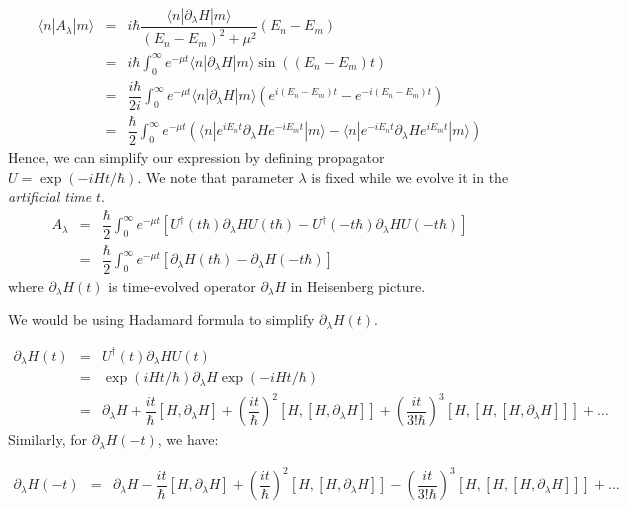 \documentclass[11pt,a4paper]{article}
\begin{document}
\begin{eqnarray}
\langle n | A_{\lambda} | m \rangle &=&  i \hbar \dfrac{\langle n | \partial_{\lambda}H  | m \rangle}{(E_n-E_m)^2 + \mu^2} (E_n-E_m) \\
&=& i \hbar  \int^{\infty}_{0} e^{-\mu t} \langle n | \partial_{\lambda}H  | m \rangle \sin((E_n-E_m)t) \\
&=& \dfrac{i \hbar}{2i}  \int^{\infty}_{0} e^{-\mu t} \langle n | \partial_{\lambda}H  | m \rangle \left( e^{i(E_n-E_m)t} - e^{-i(E_n-E_m)t} \right) \\
&=& \dfrac{ \hbar}{2}  \int^{\infty}_{0} e^{-\mu t}  \left(  \langle n | e^{iE_nt} \partial_{\lambda}H   e^{-i E_m t} | m \rangle  -  \langle n |e^{-i E_n t}  \partial_{\lambda}H  e^{ i E_mt} | m \rangle  \right) 
\end{eqnarray}
Hence, we can simplify our expression by defining propagator  $U= \exp(-i H t/ \hbar)$. We note that parameter $\lambda$ is fixed while we evolve it in the \textit{artificial time} $t$.
\begin{eqnarray}
A_{\lambda} &=& \dfrac{\hbar}{2 }\int_0^{\infty} e^{-\mu t} [U^{\dagger}(t \hbar) \partial_{\lambda} H U(t  \hbar) - U^{\dagger}(-t  \hbar) \partial_{\lambda}H U(-t \hbar)]  \\
&=& \dfrac{\hbar}{2 }\int_0^{\infty} e^{-\mu t} [ \partial_{\lambda} H (t \hbar) -  \partial_{\lambda}H (-t  \hbar)  ]  
\end{eqnarray}
where $\partial_{\lambda}H (t)$ is time-evolved operator $\partial_{\lambda}H$ in Heisenberg picture.

We would be using  Hadamard formula to simplify $\partial_{\lambda}H (t)$.

\begin{eqnarray}
\partial_{\lambda}H (t) &=& U^{\dagger}(t ) \partial_{\lambda} H U(t ) \\
&=& \exp(i H t/ \hbar) \partial_{\lambda} H \exp(-i H t/ \hbar)  \\
&=&  \partial_{\lambda} H  + \dfrac{i t}{ \hbar} [H, \partial_{\lambda} H] + \left(\dfrac{i t}{ \hbar}\right)^2 [H,[H, \partial_{\lambda} H]]  + \left(\dfrac{i t}{  3! \hbar}\right)^3 [H,[H,[H, \partial_{\lambda} H]]]   + \ldots
\end{eqnarray}
Similarly,  for $\partial_{\lambda}H (-t)$, we have:

\begin{eqnarray}
\partial_{\lambda}H (-t) &=&  \partial_{\lambda} H  - \dfrac{i t}{ \hbar} [H, \partial_{\lambda} H] + \left(\dfrac{i t}{ \hbar}\right)^2 [H,[H, \partial_{\lambda} H]]  - \left(\dfrac{i t}{  3! \hbar}\right)^3 [H,[H,[H, \partial_{\lambda} H]]]   + \ldots
\end{eqnarray}
\end{document}
